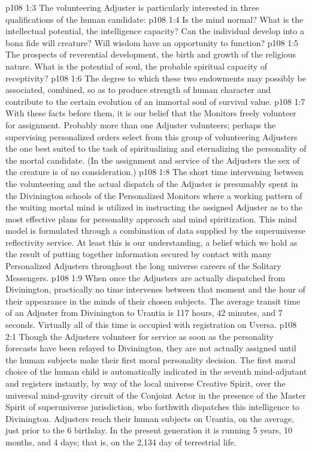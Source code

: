 \vs p108 1:3 The volunteering Adjuster is particularly interested in three qualifications of the human candidate:
\vs p108 1:4 \bibnobreakspace {} Is the mind normal? What is the intellectual potential, the intelligence capacity? Can the individual develop into a bona fide will creature? Will wisdom have an opportunity to function?
\vs p108 1:5 \bibnobreakspace {} The prospects of reverential development, the birth and growth of the religious nature. What is the potential of soul, the probable spiritual capacity of receptivity?
\vs p108 1:6 \bibnobreakspace {} The degree to which these two endowments may possibly be associated, combined, so as to produce strength of human character and contribute to the certain evolution of an immortal soul of survival value.
\vs p108 1:7 \pc With these facts before them, it is our belief that the Monitors freely volunteer for assignment. Probably more than one Adjuster volunteers; perhaps the supervising personalized orders select from this group of volunteering Adjusters the one best suited to the task of spiritualizing and eternalizing the personality of the mortal candidate. (In the assignment and service of the Adjusters the sex of the creature is of no consideration.)
\vs p108 1:8 The short time intervening between the volunteering and the actual dispatch of the Adjuster is presumably spent in the Divinington schools of the Personalized Monitors where a working pattern of the waiting mortal mind is utilized in instructing the assigned Adjuster as to the most effective plans for personality approach and mind spiritization. This mind model is formulated through a combination of data supplied by the superuniverse reflectivity service. At least this is our understanding, a belief which we hold as the result of putting together information secured by contact with many Personalized Adjusters throughout the long universe careers of the Solitary Messengers.
\vs p108 1:9 When once the Adjusters are actually dispatched from Divinington, practically no time intervenes between that moment and the hour of their appearance in the minds of their chosen subjects. The average transit time of an Adjuster from Divinington to Urantia is 117 hours, 42 minutes, and 7 seconds. Virtually all of this time is occupied with registration on Uversa.
\vs p108 2:1 Though the Adjusters volunteer for service as soon as the personality forecasts have been relayed to Divinington, they are not actually assigned until the human subjects make their first moral personality decision. The first moral choice of the human child is automatically indicated in the seventh mind\hyp{}adjutant and registers instantly, by way of the local universe Creative Spirit, over the universal mind\hyp{}gravity circuit of the Conjoint Actor in the presence of the Master Spirit of superuniverse jurisdiction, who forthwith dispatches this intelligence to Divinington. Adjusters reach their human subjects on Urantia, on the average, just prior to the 6 birthday. In the present generation it is running 5 years, 10 months, and 4 days; that is, on the 2,134 day of terrestrial life.
